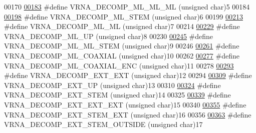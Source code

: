 \begin{DoxyCode}
00170 
\hyperlink{group__constraints_ga735517266f2e35e1374b8f1ea77ef23e}{00183} \textcolor{preprocessor}{#define VRNA\_DECOMP\_ML\_ML\_ML    (unsigned char)5}
00184 
\hyperlink{group__constraints_ga4a23054c75d8efc785de50e3ea87602f}{00198} \textcolor{preprocessor}{#define VRNA\_DECOMP\_ML\_STEM     (unsigned char)6}
00199 
\hyperlink{group__constraints_ga7f4cb9ff7a33e67f0539bd39e7b19a78}{00213} \textcolor{preprocessor}{#define VRNA\_DECOMP\_ML\_ML       (unsigned char)7}
00214 
\hyperlink{group__constraints_gae6478dda14e50e2f2cb9ef333a29256e}{00229} \textcolor{preprocessor}{#define VRNA\_DECOMP\_ML\_UP       (unsigned char)8}
00230 
\hyperlink{group__constraints_ga63d8ceb8c96ae3b463e529e28cc0fe98}{00245} \textcolor{preprocessor}{#define VRNA\_DECOMP\_ML\_ML\_STEM (unsigned char)9}
00246 
\hyperlink{group__constraints_ga4fe48d575830b16c208e280e01ab1497}{00261} \textcolor{preprocessor}{#define VRNA\_DECOMP\_ML\_COAXIAL  (unsigned char)10}
00262 
\hyperlink{group__constraints_ga0224727f7b8ad2f23eb0a3fd28d8b3fb}{00277} \textcolor{preprocessor}{#define VRNA\_DECOMP\_ML\_COAXIAL\_ENC  (unsigned char)11}
00278 
\hyperlink{group__constraints_ga437adf5115c1999304eff26b41e4c9b6}{00293} \textcolor{preprocessor}{#define VRNA\_DECOMP\_EXT\_EXT     (unsigned char)12}
00294 
\hyperlink{group__constraints_gaff1ddaffe86d984623910b40cc8a8717}{00309} \textcolor{preprocessor}{#define VRNA\_DECOMP\_EXT\_UP      (unsigned char)13}
00310 
\hyperlink{group__constraints_gae44b5ace0d9b4a29088069ecb4cec441}{00324} \textcolor{preprocessor}{#define VRNA\_DECOMP\_EXT\_STEM (unsigned char)14}
00325 
\hyperlink{group__constraints_ga803bd818b3f4b2b0a4a5cfa2f7dc2045}{00339} \textcolor{preprocessor}{#define VRNA\_DECOMP\_EXT\_EXT\_EXT (unsigned char)15}
00340 
\hyperlink{group__constraints_gabb09c5b78b75a44502fc77b950125c1e}{00355} \textcolor{preprocessor}{#define VRNA\_DECOMP\_EXT\_STEM\_EXT (unsigned char)16}
00356 
\hyperlink{group__constraints_gae7554cd3ff089360c02e4920229e221c}{00363} \textcolor{preprocessor}{#define VRNA\_DECOMP\_EXT\_STEM\_OUTSIDE (unsigned char)17}

\end{DoxyCode}
